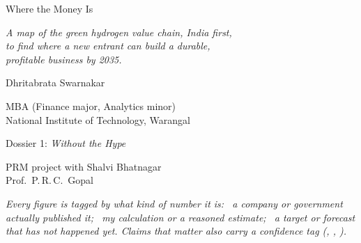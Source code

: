 \thispagestyle{empty}
{}
\vspace*{30mm}
\par\vspace{8mm}
{\display\fontsize{40}{44}\selectfont\color{ink} Where the Money Is\par}
\vspace{6mm}\redrule\par\vspace{6mm}
{\displaysemi\itshape\fontsize{15}{20}\selectfont\color{ink2}A map of the green hydrogen value chain, India first,\\ to find where a new entrant can build a durable,\\ profitable business by 2035.\par}
\vspace{22mm}
\begin{minipage}[t]{0.52\textwidth}
\par\smallskip
{\large Dhritabrata Swarnakar}\par
{\small\color{ink2} MBA (Finance major, Analytics minor) \\ National Institute of Technology, Warangal}
\end{minipage}\hfill
\begin{minipage}[t]{0.42\textwidth}
\par\smallskip
{\large Dossier 1: \emph{Without the Hype}}\par
{\small\color{ink2} PRM project with Shalvi Bhatnagar \\ Prof.\ P.\,R.\,C.\ Gopal}
\end{minipage}
\vfill
\begin{minipage}{0.92\textwidth}\small\color{ink2}\itshape
Every figure is tagged by what kind of number it is:
\rep\ a company or government actually published it; \estd\ my calculation or a reasoned estimate; \prj\ a target or forecast that has not happened yet. Claims that matter also carry a confidence tag (\confH, \confM, \confL).
\end{minipage}
\vspace{10mm}
\newpage

